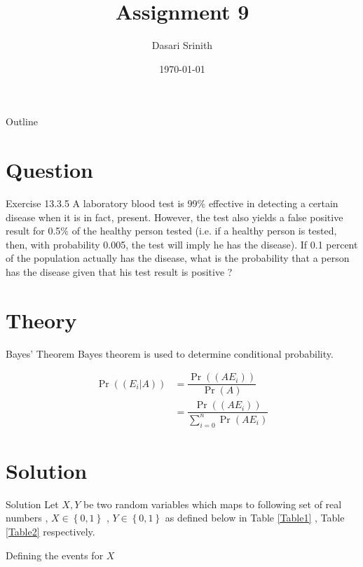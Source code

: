 \documentclass{beamer}
\title{Assignment 9}
\author{Dasari Srinith}
\date{\today}
\providecommand{\pr}[1]{\ensuremath{\Pr\left(#1\right)}}
\providecommand{\cbrak}[1]{\ensuremath{\left\{#1\right\}}}
\begin{document}
    \begin{frame}
        \titlepage 
    \end{frame}

    \begin{frame}{Outline}
        \tableofcontents
    \end{frame}

    \section{Question}
    	\begin{frame}{Exercise 13.3.5}
    	A laboratory blood test is 99\% effective in detecting a certain disease when it is in fact, present. However, the test also yields a false positive result for 0.5\% of the healthy person tested (i.e. if a healthy person is tested, then, with probability 0.005, the test will imply he has the disease). If 0.1 percent of the population actually has the disease, what is the probability that a person has the disease given that his test result is positive ?
    	\end{frame}

    \section{Theory}
        \begin{frame}{Bayes' Theorem}
        Bayes theorem is used to determine conditional probability.
        \begin{block}{}
        \begin{align}
            \pr{(E_i|A)} &= \dfrac{\pr{(AE_i)}}{\pr{A}} \\[10pt]
                         &= \dfrac{\pr{(AE_i)}}{\sum_{i=0}^n \pr{AE_i}} 
                         \label{eq:2}
        \end{align}
        \end{block}
        \end{frame}

    \section{Solution}
    \begin{frame}{Solution}
    Let $X , Y$ be two random variables which maps to following set of real numbers , $X \in \cbrak {0,1}$ , $Y \in \cbrak {0,1}$ as defined below in Table \ref{Table1} , Table \ref{Table2} respectively.
    \begin{table}[ht!]
        
        \caption{Defining the events for $X$}
        \label{Table1}
    \end{table}
    \end{frame}
    
\end{document}
